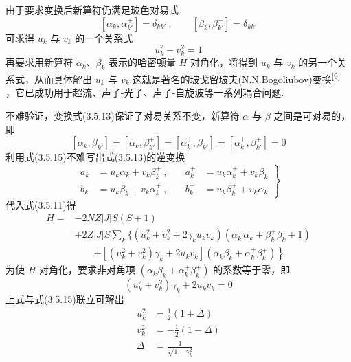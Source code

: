 由于要求变换后新算符仍满足玻色对易式
\begin{equation}
  \left[\alpha_k,\alpha_{k'}^{+}\right]=\delta_{kk'}\ ,\qquad
  \left[\beta_k,\beta_{k'}^{+}\right]=\delta_{kk'}
\end{equation}
可求得 $u_k$ 与 $v_k$ 的一个关系式
\begin{equation}
  u_k^2-v_k^2=1
\end{equation}
再要求用新算符 $\alpha_k$、$\beta_k$ 表示的哈密顿量 $H$
对角化，将得到 $u_k$ 与 $v_k$
的另一个关系式，从而具体解出 $u_k$ 与
$v_k$.这就是著名的玻戈留玻夫(N.N.Bogoliubov)变换\textsuperscript{[9]}
，它已成功用于超流、声子-光子、声子-自旋波等一系列耦合问题.

不难验证，变换式(3.5.13)保证了对易关系不变，新算符 $\alpha$ 与 $\beta$ 之间是可对易的，即
\begin{equation}
  \left[\alpha_k,\beta_{k'}\right]=\left[\alpha_k,\beta_{k'}^{+}\right]
  =\left[\alpha_k^{+},\beta_{k'}\right]=\left[\alpha_k^{+},\beta_{k'}^{+}\right]=0
\end{equation}
利用式(3.5.15)不难写出式(3.5.13)的逆变换
\begin{equation}
  \left.\begin{aligned}
    a_k&=u_k\alpha_k+v_k\beta_k^{+}\ ,&\quad a_k^{+}&=u_k\alpha_k^{+}+v_k\beta_k\\
    b_k&=u_k\beta_k+v_k\alpha_k^{+}\ ,&\quad b_k^{+}&=u_k\beta_k^{+}+v_k\alpha_k
  \end{aligned}\right\}
\end{equation}
代入式(3.5.11)得
\begin{equation}
\begin{aligned}
  H={}&-2NZ\left|J\right|S\left(S+1\right)\\
  &+2Z\left|J\right|S\sum_k\biggl\{\left(u_k^2+v_k^2+2\gamma_ku_kv_k\right)
  \left(\alpha_k^{+}\alpha_k+\beta_k^{+}\beta_k+1\right)\\
  &\qquad\left.+\left[\left(u_k^2+v_k^2\right)\gamma_k+2u_kv_k\right]
  \left(\alpha_k\beta_k+\alpha_k^{+}\beta_k^{+}\right)\right\}
\end{aligned}
\end{equation}
为使 $H$ 对角化，要求非对角项 $\left(\alpha_k\beta_k+\alpha_k^{+}\beta_k^{+}\right)$ 的系数等于零，即
\begin{equation}
  \left(u_k^2+v_k^2\right)\gamma_k+2u_kv_k=0
\end{equation}
上式与式(3.5.15)联立可解出
\begin{equation}
\begin{aligned}
  u_k^2&=\frac{1}{2}\left(1+\Delta\right)\\
  v_k^2&=-\frac{1}{2}\left(1-\Delta\right)\\
  \Delta&=\frac{1}{\sqrt{1-\gamma_k^2}}
\end{aligned}
\end{equation}

